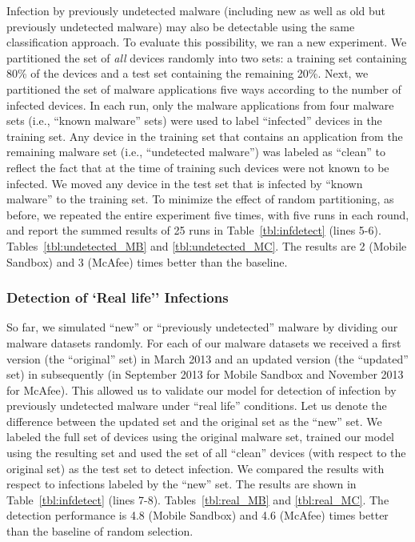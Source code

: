 Infection by previously undetected malware (including new as well as
old but previously undetected malware) may also be detectable using
the same classification approach.  To evaluate this possibility, we
ran a new experiment.
We partitioned the
set of \textit{all} devices randomly into two sets: a training set
containing 80\% of the devices and a test set containing the remaining
20\%.  Next, we partitioned the set of malware applications five ways
according to the number of infected devices. 
In each run, only the
malware applications from four malware sets (i.e., ``known malware''
sets) were used to label ``infected'' devices in the training set.
Any device in the training set that contains an application from the
remaining malware set (i.e., ``undetected malware'') was labeled as
``clean'' to reflect the fact that at the time of training such
devices were not known to be infected.  We moved any device in the
test set that is infected by ``known malware'' to the training set.
To minimize the effect of random partitioning, as before, we repeated
the entire experiment five times, with five runs in each round, and report
the summed results of 25 runs in 
\ifwww
Table~\ref{tbl:infdetect} (lines 5-6).
\else
Tables~\ref{tbl:undetected_MB}
and \ref{tbl:undetected_MC}.
\fi 
The results are 2 (Mobile Sandbox) and 3
(McAfee) times better than the baseline.


\subsubsection{Detection of `Real life'' Infections}
\label{subsubsec:predictions:applications:reallife}

So far, we simulated ``new'' or ``previously undetected'' malware by
dividing our malware datasets randomly.  For each of our malware
datasets we received a first version (the ``original'' set) in March
2013 and an updated version (the ``updated'' set) in subsequently (in
September 2013 for Mobile Sandbox and November 2013 for McAfee).  This
allowed us to validate our model for detection of infection by
previously undetected malware under ``real life'' conditions.  Let us
denote the difference between the updated set and the original set as
the ``new'' set.  We labeled the full set of devices using the
original malware set, trained our model using the resulting set and
used the set of all ``clean'' devices (with respect to the original
set) as the test set to detect infection. We compared the results
with respect to infections labeled by the ``new'' set.
The results are shown in 
\ifwww
Table~\ref{tbl:infdetect} (lines 7-8).
\else
Tables~\ref{tbl:real_MB} and
\ref{tbl:real_MC}.
\fi 
The detection performance is 4.8 (Mobile Sandbox)
and 4.6 (McAfee) times better than the baseline of random selection.
